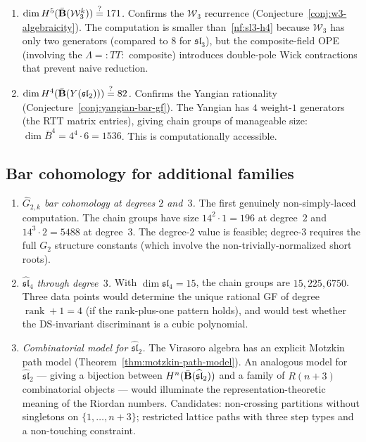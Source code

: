 \begin{enumerate}[label=\textbf{NF-\arabic*.}, leftmargin=3em]
\item\label{nf:w3-h5}
\emph{$\dim H^5(\bar{\mathbf{B}}(\mathcal{W}_3^k)) \stackrel{?}{=} 171$.}
Confirms the $\mathcal{W}_3$ recurrence (Conjecture~\ref{conj:w3-algebraicity}).  The computation is smaller than~\ref{nf:sl3-h4} because $\mathcal{W}_3$ has only two generators (compared to $8$ for $\mathfrak{sl}_3$), but the composite-field OPE (involving the $\Lambda = {:}TT{:}$ composite) introduces double-pole Wick contractions that prevent naive reduction.

\item\label{nf:yangian-h4}
\emph{$\dim H^4(\bar{\mathbf{B}}(Y(\mathfrak{sl}_2))) \stackrel{?}{=} 82$.}
Confirms the Yangian rationality (Conjecture~\ref{conj:yangian-bar-gf}).  The Yangian has $4$ weight-$1$ generators (the RTT matrix entries), giving chain groups of manageable size: $\dim\bar{B}^4 = 4^4 \cdot 6 = 1536$.  This is computationally accessible.
\end{enumerate}

\subsection{Bar cohomology for additional families}

\begin{enumerate}[label=\textbf{MF-\arabic*.}, leftmargin=3em]
\item \emph{$\widehat{G}_{2,k}$ bar cohomology at degrees $2$ and~$3$.}
The first genuinely non-simply-laced computation.  The chain groups have size $14^2 \cdot 1 = 196$ at degree~$2$ and $14^3 \cdot 2 = 5488$ at degree~$3$.  The degree-$2$ value is feasible; degree-$3$ requires the full $G_2$ structure constants (which involve the non-trivially-normalized short roots).

\item \emph{$\widehat{\mathfrak{sl}}_4$ through degree~$3$.}
With $\dim\mathfrak{sl}_4 = 15$, the chain groups are $15, 225, 6750$.  Three data points would determine the unique rational GF of degree $\operatorname{rank} + 1 = 4$ (if the rank-plus-one pattern holds), and would test whether the DS-invariant discriminant is a cubic polynomial.

\item \emph{Combinatorial model for $\widehat{\mathfrak{sl}}_2$.}
The Virasoro algebra has an explicit Motzkin path model (Theorem~\ref{thm:motzkin-path-model}).  An analogous model for $\widehat{\mathfrak{sl}}_2$ --- giving a bijection between $H^n(\bar{\mathbf{B}}(\widehat{\mathfrak{sl}}_2))$ and a family of $R(n+3)$ combinatorial objects --- would illuminate the representation-theoretic meaning of the Riordan numbers.  Candidates: non-crossing partitions without singletons on $\{1, \ldots, n+3\}$; restricted lattice paths with three step types and a non-touching constraint.
\end{enumerate}

